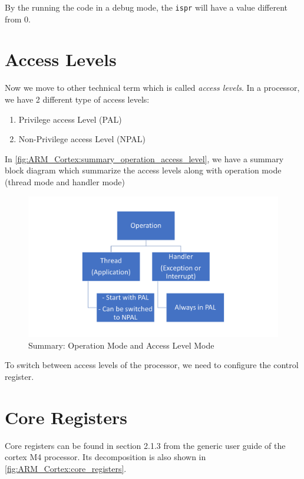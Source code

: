 By the running the code in a debug mode, the \verb|ispr| will have a value different from 0.

\newpage
\section{Access Levels}

Now we move to other technical term which is called \textit{access levels}. In a processor, we have 2 different type of access levels:

\begin{enumerate}
    \item Privilege access Level (PAL)

    \item Non-Privilege access Level (NPAL)
\end{enumerate}

In \autoref{fig:ARM_Cortex:summary_operation_access_level}, we have a summary block diagram which summarize the access levels along with operation mode (thread mode and handler mode)

\begin{figure}[h]
\centering
\includegraphics[scale=0.5]{Figures/ARM_Cortex/summary_operation_access_level}
\caption{Summary: Operation Mode and Access Level Mode}
\label{fig:ARM_Cortex:summary_operation_access_level}
\end{figure}

To switch between access levels of the processor, we need to configure the control register.

\newpage
\section{Core Registers}
\label{Sec:Core_Registers}

Core registers can be found in section 2.1.3 from the generic user guide of the cortex M4 processor. Its decomposition is also shown in \autoref{fig:ARM_Cortex:core_registers}.

